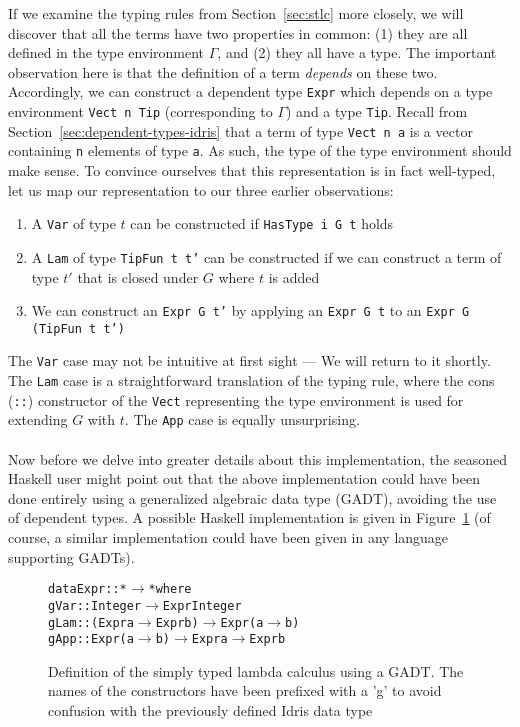 If we examine the typing rules from Section~\ref{sec:stlc} more closely, we will discover that all the terms have two properties in common: (1) they are all defined in the type environment $\Gamma$, and (2) they all have a type. The important observation here is that the definition of a term \emph{depends} on these two. Accordingly, we can construct a dependent type \texttt{Expr} which depends on a type environment \texttt{Vect n Tip} (corresponding to $\Gamma$) and a type \texttt{Tip}. Recall from Section~\ref{sec:dependent-types-idris} that a term of type \texttt{Vect n a} is a vector containing \texttt{n} elements of type \texttt{a}. As such, the type of the type environment should make sense. To convince ourselves that this representation is in fact well-typed, let us map our representation to our three earlier observations:

\begin{enumerate}
\item A \texttt{Var} of type $t$ can be constructed if \texttt{HasType i G t} holds
\item A \texttt{Lam} of type \texttt{TipFun t t'} can be constructed if we can construct a term of type $t'$ that is closed under $G$ where $t$ is added
\item We can construct an \texttt{Expr G t'} by applying an \texttt{Expr G t} to an \texttt{Expr G (TipFun t t')}
\end{enumerate}

The \texttt{Var} case may not be intuitive at first sight --- We will return to it shortly. The \texttt{Lam} case is a straightforward translation of the typing rule, where the cons (\texttt{::}) constructor of the \texttt{Vect} representing the type environment is used for extending $G$ with $t$. The \texttt{App} case is equally unsurprising.

\paragraph{}
Now before we delve into greater details about this implementation, the seasoned Haskell user might point out that the above implementation could have been done entirely using a generalized algebraic data type (GADT), avoiding the use of dependent types. A possible Haskell implementation is given in Figure~\ref{fig:stlc-GADT} (of course, a similar implementation could have been given in any language supporting GADTs).

\begin{figure}
\begin{alltt}
data Expr :: * \(\rightarrow\) * where
  gVar :: Integer \(\rightarrow\) Expr Integer
  gLam :: (Expr a \(\rightarrow\) Expr b) \(\rightarrow\) Expr (a \(\rightarrow\) b)
  gApp :: Expr (a \(\rightarrow\) b) \(\rightarrow\) Expr a \(\rightarrow\) Expr b 
\end{alltt}
\caption{Definition of the simply typed lambda calculus using a GADT. The names of the constructors have been prefixed with a 'g' to avoid confusion with the previously defined Idris data type}
\label{fig:stlc-GADT}
\end{figure}

